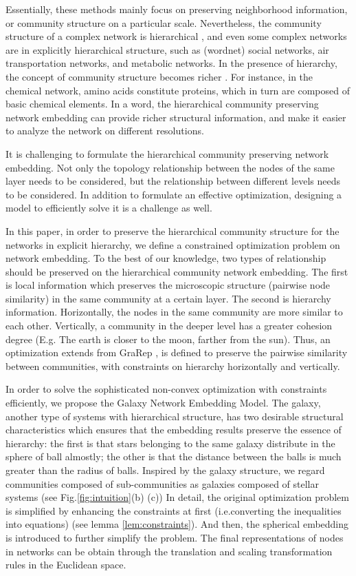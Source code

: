 \documentclass{article}
\theoremstyle{definition}
\begin{document}
		Essentially, these methods mainly focus on preserving neighborhood information, or community structure on a particular scale. 
		Nevertheless, the community structure of a complex network is hierarchical \cite{clauset2006structural}, and even some complex networks are in explicitly hierarchical structure, such as (wordnet) social networks, air transportation networks, and metabolic networks. 
		In the presence of hierarchy, the concept of community structure becomes richer \cite{sales-pardo2007extracting}. For instance, in the chemical network, amino acids constitute proteins, which in turn are composed of basic chemical elements. 
		In a word, the hierarchical community preserving network embedding can provide richer structural information, and make it easier to analyze the network on different resolutions.

		It is challenging to formulate the hierarchical community preserving network embedding. Not only the topology relationship between the nodes of the same layer needs to be considered, but the relationship between different levels needs to be considered. In addition to formulate an effective optimization, designing a model to efficiently solve it is a challenge as well. 

		In this paper, in order to preserve the hierarchical community structure for the networks in explicit hierarchy, we define a constrained optimization problem on network embedding. To the best of our knowledge, two types of relationship should be preserved on the hierarchical community network embedding. The first is local information which preserves the microscopic structure (pairwise node similarity) in the same community at a certain layer. The second is hierarchy information. Horizontally, the nodes in the same community are more similar to each other. Vertically, a community in the deeper level has a greater cohesion degree (E.g. The earth is closer to the moon, farther from the sun). Thus, an optimization extends from GraRep \cite{Cao2015GraRep}, is defined to preserve the pairwise similarity between communities, with constraints on hierarchy horizontally and vertically. 

		In order to solve the sophisticated non-convex optimization with constraints efficiently, we propose the Galaxy Network Embedding Model. The galaxy, another type of systems with hierarchical structure, has two desirable structural characteristics which ensures that the embedding results preserve the essence of hierarchy: the first is that stars belonging to the same galaxy distribute in the sphere of ball almostly; the other is that the distance between the balls is much greater than the radius of balls. Inspired by the galaxy structure, we regard communities composed of sub-communities as galaxies composed of stellar systems (see Fig.\ref{fig:intuition}(b) (c)) 
		In detail, the original optimization problem is simplified by enhancing the constraints at first (i.e.converting the inequalities into equations) (see lemma \ref{lem:constraints}). And then, the spherical embedding is introduced to further simplify the problem. The final representations of nodes in networks can be obtain through the translation and scaling transformation rules in the Euclidean space.
\end{document}
